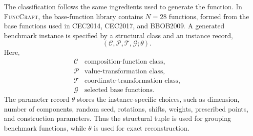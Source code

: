 \documentclass[11pt,a4paper]{article}
\theoremstyle{remark}
\theoremstyle{plain}
\begin{document}
The classification follows the same ingredients used to generate the function.
In \textsc{FuncCraft}, the base-function library contains \(N=28\) functions,
formed from the base functions used in CEC2014, CEC2017, and BBOB2009. A
generated benchmark instance is specified by a structural class and an instance
record,
\[
	\left(\mathcal{C},\mathcal{P},\mathcal{T},\mathcal{G};\theta\right).
\]
Here,
\[
\begin{array}{ll}
\mathcal{C} & \text{composition-function class},\\
\mathcal{P} & \text{value-transformation class},\\
\mathcal{T} & \text{coordinate-transformation class},\\
\mathcal{G} & \text{selected base functions}.
\end{array}
\]
The parameter record \(\theta\) stores the instance-specific choices, such as
dimension, number of components, random seed, rotations, shifts, weights,
prescribed points, and construction parameters. Thus the structural tuple is used
for grouping benchmark functions, while \(\theta\) is used for exact
reconstruction.
\end{document}

